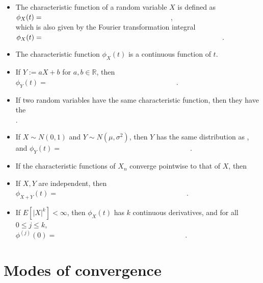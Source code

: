 \documentclass[12pt,reqno]{article}
\theoremstyle{plain}
\theoremstyle{definition}
\begin{document}
\begin{itemize} 

\item The characteristic function of a random variable $X$ is defined as 
      $\phi_X(t) = \hspace{2.5in}$, \\ which is also given by the Fourier transformation 
      integral $\phi_X(t) = \hspace{3.5in}$. 
\item The characteristic function $\phi_X(t)$ is a \underline{\hspace{2in}} 
      continuous function of $t$. 
\item If $Y := aX+b$ for $a,b \in \mathbb{R}$, then $\phi_Y(t) = \hspace{3in}$. 
\item If two random variables have the same characteristic function, then they have the \\ 
      \underline{\hspace{4in}}. 
\item If $X \sim N(0, 1)$ and $Y \sim N(\mu, \sigma^2)$, then $Y$ has the same distribution as 
      \hspace{2.5in}, \\ and $\phi_Y(t) = \hspace{3in}$. 
\item If the characteristic functions of $X_n$ converge pointwise to that of $X$, then 
\item If $X,Y$ are independent, then $\phi_{X+Y}(t) = \hspace{3in}$. 
\item If $E[|X|^k] < \infty$, then $\phi_X(t)$ has $k$ continuous derivatives, and for all 
      $0 \leq j \leq k$, \\ $\phi^{(j)}(0) = \hspace{3in}$. 

\end{itemize} 

\section{Modes of convergence} 
\end{document}
